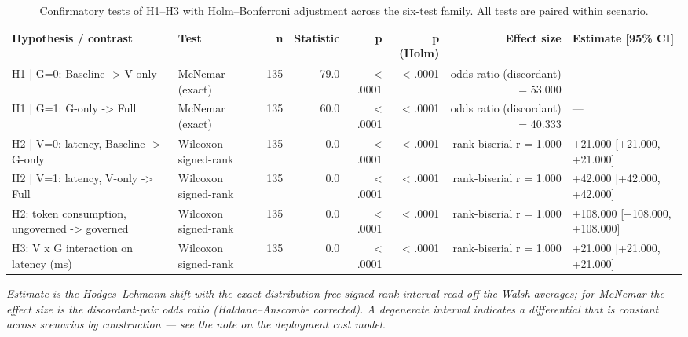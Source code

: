 \begin{table}[htbp]
\centering
\small
\caption{Confirmatory tests of H1–H3 with Holm–Bonferroni adjustment across the six-test family. All tests are paired within scenario.}
\label{tab:gmais-4}
\begin{tabular}{llrrrrrl}
\toprule
Hypothesis / contrast & Test & n & Statistic & p & p (Holm) & Effect size & Estimate [95\% CI] \\
\midrule
H1 | G=0: Baseline -> V-only & McNemar (exact) & 135 & 79.0 & < .0001 & < .0001 & odds ratio (discordant) = 53.000 & --- \\
H1 | G=1: G-only -> Full & McNemar (exact) & 135 & 60.0 & < .0001 & < .0001 & odds ratio (discordant) = 40.333 & --- \\
H2 | V=0: latency, Baseline -> G-only & Wilcoxon signed-rank & 135 & 0.0 & < .0001 & < .0001 & rank-biserial r = 1.000 & +21.000 [+21.000, +21.000] \\
H2 | V=1: latency, V-only -> Full & Wilcoxon signed-rank & 135 & 0.0 & < .0001 & < .0001 & rank-biserial r = 1.000 & +42.000 [+42.000, +42.000] \\
H2: token consumption, ungoverned -> governed & Wilcoxon signed-rank & 135 & 0.0 & < .0001 & < .0001 & rank-biserial r = 1.000 & +108.000 [+108.000, +108.000] \\
H3: V x G interaction on latency (ms) & Wilcoxon signed-rank & 135 & 0.0 & < .0001 & < .0001 & rank-biserial r = 1.000 & +21.000 [+21.000, +21.000] \\
\bottomrule
\end{tabular}
\par\vspace{2pt}\footnotesize\emph{Estimate is the Hodges–Lehmann shift with the exact distribution-free signed-rank interval read off the Walsh averages; for McNemar the effect size is the discordant-pair odds ratio (Haldane–Anscombe corrected). A degenerate interval indicates a differential that is constant across scenarios by construction --- see the note on the deployment cost model.}
\end{table}
